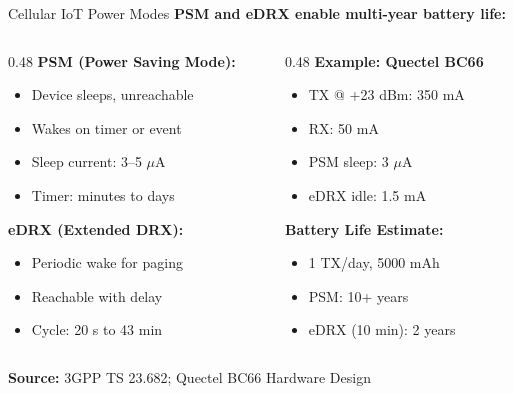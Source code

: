 \documentclass[aspectratio=169,11pt]{beamer}
\begin{document}
\begin{frame}{Cellular IoT Power Modes}
    \textbf{PSM and eDRX enable multi-year battery life:}
    
    \vspace{0.3cm}
    \begin{columns}[T]
        \begin{column}{0.48\textwidth}
            \textbf{PSM (Power Saving Mode):}
            \begin{itemize}
                \item Device sleeps, unreachable
                \item Wakes on timer or event
                \item Sleep current: 3--5 $\mu$A
                \item Timer: minutes to days
            \end{itemize}
            
            \vspace{0.2cm}
            \textbf{eDRX (Extended DRX):}
            \begin{itemize}
                \item Periodic wake for paging
                \item Reachable with delay
                \item Cycle: 20 s to 43 min
            \end{itemize}
        \end{column}
        \begin{column}{0.48\textwidth}
            \textbf{Example: Quectel BC66}
            \begin{itemize}
                \item TX @ +23 dBm: 350 mA
                \item RX: 50 mA
                \item PSM sleep: 3 $\mu$A
                \item eDRX idle: 1.5 mA
            \end{itemize}
            
            \vspace{0.2cm}
            \textbf{Battery Life Estimate:}
            \begin{itemize}
                \item 1 TX/day, 5000 mAh
                \item PSM: 10+ years
                \item eDRX (10 min): 2 years
            \end{itemize}
        \end{column}
    \end{columns}
    
    \vspace{0.2cm}
    \textbf{Source:} 3GPP TS 23.682; Quectel BC66 Hardware Design
\end{frame}
\end{document}

